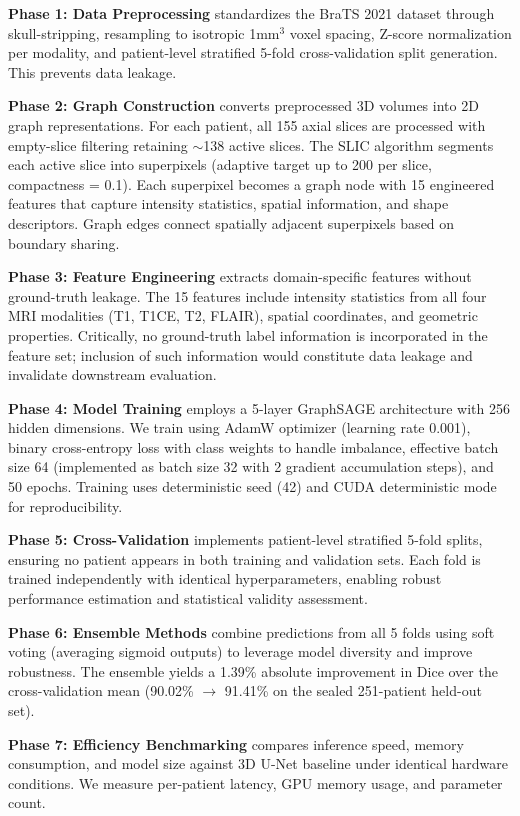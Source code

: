 \textbf{Phase 1: Data Preprocessing} standardizes the BraTS 2021 dataset through skull-stripping, resampling to isotropic 1mm$^3$ voxel spacing, Z-score normalization per modality, and patient-level stratified 5-fold cross-validation split generation. This prevents data leakage.

\textbf{Phase 2: Graph Construction} converts preprocessed 3D volumes into 2D graph representations. For each patient, all 155 axial slices are processed with empty-slice filtering retaining $\sim$138 active slices. The SLIC algorithm segments each active slice into superpixels (adaptive target up to 200 per slice, compactness = 0.1). Each superpixel becomes a graph node with 15 engineered features that capture intensity statistics, spatial information, and shape descriptors. Graph edges connect spatially adjacent superpixels based on boundary sharing.

\textbf{Phase 3: Feature Engineering} extracts domain-specific features without ground-truth leakage. The 15 features include intensity statistics from all four MRI modalities (T1, T1CE, T2, FLAIR), spatial coordinates, and geometric properties. Critically, no ground-truth label information is incorporated in the feature set; inclusion of such information would constitute data leakage and invalidate downstream evaluation.

\textbf{Phase 4: Model Training} employs a 5-layer GraphSAGE architecture with 256 hidden dimensions. We train using AdamW optimizer (learning rate 0.001), binary cross-entropy loss with class weights to handle imbalance, effective batch size 64 (implemented as batch size 32 with 2 gradient accumulation steps), and 50 epochs. Training uses deterministic seed (42) and CUDA deterministic mode for reproducibility.

\textbf{Phase 5: Cross-Validation} implements patient-level stratified 5-fold splits, ensuring no patient appears in both training and validation sets. Each fold is trained independently with identical hyperparameters, enabling robust performance estimation and statistical validity assessment.

\textbf{Phase 6: Ensemble Methods} combine predictions from all 5 folds using soft voting (averaging sigmoid outputs) to leverage model diversity and improve robustness. The ensemble yields a 1.39\% absolute improvement in Dice over the cross-validation mean (90.02\% $\rightarrow$ 91.41\% on the sealed 251-patient held-out set).

\textbf{Phase 7: Efficiency Benchmarking} compares inference speed, memory consumption, and model size against 3D U-Net baseline under identical hardware conditions. We measure per-patient latency, GPU memory usage, and parameter count.

